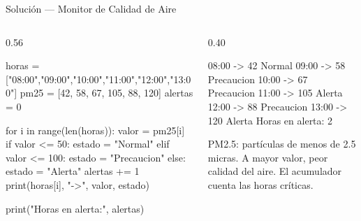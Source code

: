\documentclass[aspectratio=169, 11pt]{beamer}
\begin{document}
\begin{frame}[fragile,shrink=35]{Solución --- Monitor de Calidad de Aire}
  \vspace{-6pt}
  \begin{columns}[T]
    \begin{column}{0.56\textwidth}
      \begin{pyblock}
horas = ["08:00","09:00","10:00","11:00","12:00","13:00"]
pm25  = [42, 58, 67, 105, 88, 120]
alertas = 0

for i in range(len(horas)):
    valor = pm25[i]
    if valor <= 50:
        estado = "Normal"
    elif valor <= 100:
        estado = "Precaucion"
    else:
        estado = "Alerta"
        alertas += 1
    print(horas[i], "->", valor, estado)

print("Horas en alerta:", alertas)
      \end{pyblock}
    \end{column}

    \begin{column}{0.40\textwidth}
      \vspace{4pt}
      \begin{outputblock}
08:00 -> 42 Normal
09:00 -> 58 Precaucion
10:00 -> 67 Precaucion
11:00 -> 105 Alerta
12:00 -> 88 Precaucion
13:00 -> 120 Alerta
Horas en alerta: 2
      \end{outputblock}
      \vspace{4pt}
      {\scriptsize\color{textMuted}
        PM2.5: partículas de menos de 2.5 micras.
        A mayor valor, peor calidad del aire.
        El acumulador cuenta las horas críticas.}
    \end{column}
  \end{columns}
\end{frame}
\end{document}
